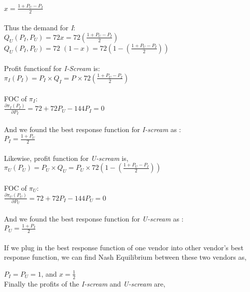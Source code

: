 \documentclass[a4paper, 12pt]{article}
\begin{document}
	$x=\frac{1+P_{U}-P_{I}}{2}$\\
	\\
	Thus the demand for \textit{I}:\\
	
	$Q_{U}(P_{I}, P_{U}) = 72x = 72\left (\frac{1+P_{U}-P_{I}}{2}\right)$\\
	
	$Q_{U}(P_{I}, P_{U}) = 72$ $(1-x) = 72\left (1- \left (\frac{1+P_{U}-P_{I}}{2}\right)\right)$\\
	\\
	Profit functionf for \textit{I-Scream} is:\\
	
	$\pi_{I}(P_{I}) = P_{I} \times Q_{I} = P_{} \times 72\left (\frac{1+P_{U}-P_{I}}{2}\right)$\\
	\\
	FOC of $\pi_{I}$:\\

	$\frac{\partial \pi_{I}(P_{I})}{\partial P_{I}}=72 + 72P_{U} - 144P_{I} = 0$\\
	\\
	And we found the best response function for \textit{I-scream} as :\\
	
	$P_{I}=\frac{1+P_{U}}{2}$\\
	\\
	Likewise, profit function for \textit{U-scream} is,\\
	
	$\pi_{U}(P_{U}) = P_{U} \times Q_{U} = P_{U} \times 72 \left (1 - \left (\frac {1 + P_{U} - P_{I}}{2} \right) \right)$\\
	\\
	FOC of $\pi_{U}$:\\

	$\frac{\partial \pi_{U}(P_{U})}{\partial P_{U}}=72 + 72P_{I} - 144P_{U} = 0$\\
	\\
	And we found the best response function for \textit{U-scream} as :\\
	
	$P_{U}=\frac{1+P_{I}}{2}$\\
	\\
	If we plug in the best response function of one vendor into other vendor’s best response function, we can find Nash Equilibrium between these two vendors as,
	
	$P_{I} = P_{U} = 1$, and $x = \frac {1}{2}$
	\\
	Finally the profits of the \textit{I-scream} and \textit{U-scream} are,
	
\end{document}

